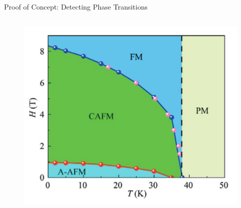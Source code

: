 \documentclass[
	10pt,
]{beamer}
\begin{document}
\begin{frame}{Proof of Concept: Detecting Phase Transitions}
\begin{columns}
		\begin{figure}
			\centering
			\includegraphics[width=\textwidth]{../notes/phase_diagram_small.png}

\end{figure}
\end{columns}
\end{frame}
\end{document}
